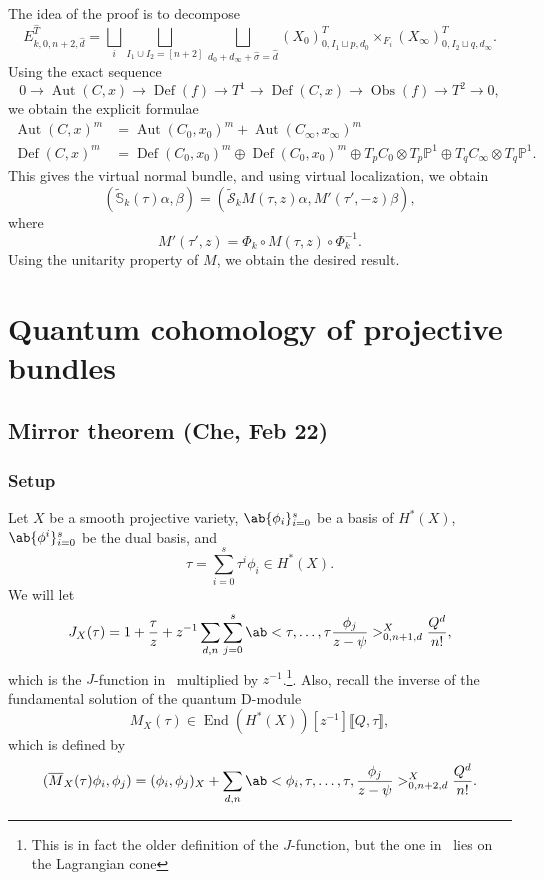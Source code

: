 \documentclass[leqno, openany]{memoir}
\theoremstyle{definition}
\theoremstyle{remark}
\theoremstyle{plain}
\theoremstyle{definition}
\theoremstyle{remark}
\newcommand{\bS}{\mathbb{S}}
\renewcommand{\P}{\mathbb{P}}
\newcommand{\M}{\overline{M}}
\newcommand{\mc}[1]{\mathcal{#1}}
\newcommand{\on}[1]{\operatorname{#1}}
\newcommand{\wt}[1]{\widetilde{#1}}
\newcommand{\wh}[1]{\widehat{#1}}
\DeclareMathOperator{\End}{End}
\DeclareMathOperator{\Aut}{Aut}
\begin{document}
The idea of the proof is to decompose
\[ E_{k,0,n+2,\wh{d}}^{\wh{T}} = \bigsqcup_i \bigsqcup_{I_1 \cup I_2 = [n+2]} \bigsqcup_{d_0 + d_{\infty} + \wh{\sigma} = \wh{{d}}} (X_0)_{0,I_1 \sqcup p, d_0}^T \times_{F_i} (X_{\infty})_{0,I_2 \sqcup q, d_{\infty}}^T. \]
Using the exact sequence
\[ 0 \to \Aut(C,x) \to \on{Def}(f) \to T^1 \to \on{Def}(C,x) \to \on{Obs}(f) \to T^2 \to 0, \]
we obtain the explicit formulae
\begin{align*}
    \Aut(C,x)^m &= \Aut(C_0,x_0)^m + \Aut(C_{\infty}, x_{\infty})^m \\
    \on{Def}(C,x)^m &= \on{Def}(C_0, x_0)^m \oplus \on{Def}(C_0, x_0)^m \oplus T_p C_0 \otimes T_p \P^1 \oplus T_q C_{\infty} \otimes T_q \P^1.
\end{align*}
This gives the virtual normal bundle, and using virtual localization, we obtain
\[ (\wt{\bS}_k(\tau) \alpha, \beta) = (\wt{\mc{S}}_k M(\tau, z) \alpha, M'(\tau', -z) \beta), \]
where
\[ M'(\tau', z) = \Phi_k \circ M(\tau, z) \circ \Phi_k^{-1}. \]
Using the unitarity property of $M$, we obtain the desired result.

\chapter{Quantum cohomology of projective bundles}%
\label{cha:Quantum cohomology of projective bundles}

\section{Mirror theorem (Che, Feb 22)}%
\label{sec:Mirror theorem}

\subsection{Setup}%
\label{sub:Setup}

Let $X$ be a smooth projective variety, $\ab\{ \phi_i\}_{i=0}^s$ be a basis of $H^*(X)$, $\ab\{\phi^i\}_{i=0}^s$ be the dual basis, and 
\[ \tau = \sum_{i=0}^s \tau^i \phi_i \in H^*(X). \]
We will let
\[ J_X(\tau) = 1 + \frac{\tau}{z} + z^{-1} \sum_{d,n} \sum_{j=0}^s \ab<\tau, \ldots, \tau \frac{\phi_j}{z-\psi}>_{0,n+1,d}^X \frac{Q^d}{n!}, \]
which is the $J$-function in~ multiplied by $z^{-1}$.\footnote{This is in fact the older definition of the $J$-function, but the one in~ lies on the Lagrangian cone}. Also, recall the inverse of the fundamental solution of the quantum D-module
\[ M_X(\tau) \in \End(H^*(X))[z^{-1}]\llbracket Q,\tau \rrbracket, \]
which is defined by
\[ (\M_X(\tau) \phi_i, \phi_j) = (\phi_i, \phi_j)_X + \sum_{d,n} \ab<\phi_i,\tau, \ldots, \tau, \frac{\phi_j}{z-\psi}>_{0,n+2,d}^X \frac{Q^d}{n!}. \]
\end{document}
